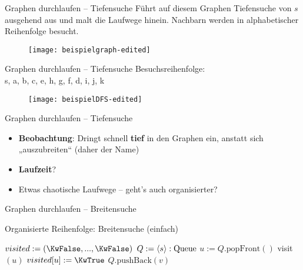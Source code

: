 \begin{frame}{Graphen durchlaufen – Tiefensuche}
	Führt auf diesem Graphen Tiefensuche von $s$ ausgehend aus und malt die Laufwege hinein. Nachbarn werden in alphabetischer Reihenfolge besucht.
	\vspace{-1.1\baselineskip}
	\begin{figure}[htp]
		\centering
		\texttt{[image: beispielgraph-edited]}
	\end{figure}
\end{frame}

\begin{frame}{Graphen durchlaufen – Tiefensuche}
	\solutionheading
	Besuchsreihenfolge: \\ s, a, b, c, e, h, g, f, d, i, j, k
	\vspace{-.4\baselineskip}
	\begin{figure}[htp]
		\centering
		\texttt{[image: beispielDFS-edited]}
	\end{figure}
\end{frame}

\begin{frame}[t]{Graphen durchlaufen – Tiefensuche}
	\begin{itemize}
		\item<+-> \textbf{Beobachtung}: Dringt schnell \textbf{tief} in den Graphen ein, anstatt sich „auszubreiten“ (daher der Name)
		\item<+-> \textbf{Laufzeit}? \visible<+->{$\Theta(n+m)$} \\ 
		\item<+-> Etwas chaotische Laufwege -- geht's auch organisierter?
	\end{itemize}
\end{frame}

\begin{frame}{Graphen durchlaufen – Breitensuche}
	\begin{exampleblock}{Organisierte Reihenfolge: Breitensuche (einfach)}
		\begin{algorithm}[H]
			 {
				$visited := (\KwFalse, ... , \KwFalse)$\;
				$Q := \llist{s} : \|Queue|$ \;
				 {
					$u := Q.\text{popFront}()$\;
					 {
						visit$(u)$  \;
						$visited[u] := \KwTrue$\;
						 {
							$Q.\text{pushBack}(v)$\;
						}
					}
				}
			}
		\end{algorithm}
	\end{exampleblock}
\end{frame}

